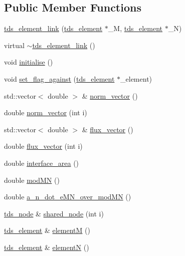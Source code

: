 \subsection*{Public Member Functions}
\begin{DoxyCompactItemize}
\item 
\hyperlink{classtds__element__link_a5e72d17aa56494cd0dd7182a0eb87f54}{tds\+\_\+element\+\_\+link} (\hyperlink{classtds__element}{tds\+\_\+element} $\ast$\+\_\+M, \hyperlink{classtds__element}{tds\+\_\+element} $\ast$\+\_\+N)
\item 
virtual \hyperlink{classtds__element__link_a77a09ccea865dd165d6924a69079df19}{$\sim$tds\+\_\+element\+\_\+link} ()
\item 
void \hyperlink{classtds__element__link_a17a877d4b5b8d4e6ec377bb9ccab4e30}{initialise} ()
\item 
void \hyperlink{classtds__element__link_ad3cf1016587c8d7b9f8417db3459798c}{set\+\_\+flag\+\_\+against} (\hyperlink{classtds__element}{tds\+\_\+element} $\ast$\+\_\+element)
\item 
std\+::vector$<$ double $>$ \& \hyperlink{classtds__element__link_ad8933188624708b7a49f5f7a881f67d8}{norm\+\_\+vector} ()
\item 
double \hyperlink{classtds__element__link_affc5b4d4c6654a65b1067652080b0310}{norm\+\_\+vector} (int i)
\item 
std\+::vector$<$ double $>$ \& \hyperlink{classtds__element__link_ae632fb7dc13fb84791eec31630618101}{flux\+\_\+vector} ()
\item 
double \hyperlink{classtds__element__link_a8d731714b11fd0da48fc7ca2f1ed5f9e}{flux\+\_\+vector} (int i)
\item 
double \hyperlink{classtds__element__link_a024e6be6142af6d8a92263d4a7903389}{interface\+\_\+area} ()
\item 
double \hyperlink{classtds__element__link_acfbf3ede6d850deb4a32c24c958e9a0d}{mod\+MN} ()
\item 
double \hyperlink{classtds__element__link_aec8d8d5c53c039dda59aecc430a0f885}{a\+\_\+n\+\_\+dot\+\_\+e\+M\+N\+\_\+over\+\_\+mod\+MN} ()
\item 
\hyperlink{classtds__node}{tds\+\_\+node} \& \hyperlink{classtds__element__link_a6c1da2a8aeca0e3d97f0dd02327a0a23}{shared\+\_\+node} (int i)
\item 
\hyperlink{classtds__element}{tds\+\_\+element} \& \hyperlink{classtds__element__link_aa5357b3d1042d36296c67b31eb01e17b}{elementM} ()
\item 
\hyperlink{classtds__element}{tds\+\_\+element} \& \hyperlink{classtds__element__link_a09a9283ddd611ab673b55c006aefb372}{elementN} ()

\end{DoxyCompactItemize}
